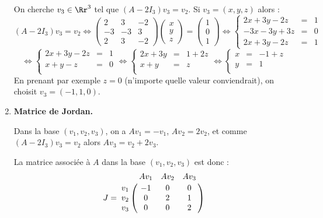 \documentclass[12pt, class=report,crop=false]{standalone}
\begin{document}
\begin{exemple}
\begin{enumerate}
  On cherche $v_3 \in \Rr^3$ tel que $(A-2I_3)v_3 = v_2$.
  Si $v_3 = (x,y,z)$ alors :
  $$(A-2I_3)v_3 = v_2 
  \iff 
  \begin{pmatrix}
  2 & 3 & -2 \\
  -3 & -3 & 3 \\
  2 & 3 & -2
  \end{pmatrix}
  \begin{pmatrix}
  x \\ y \\ z
  \end{pmatrix}
  = \begin{pmatrix}1\\0 \\1\end{pmatrix}
  \iff   
  \left\{\begin{array}{rcl}
  2x  + 3y -2z &=& 1\\
  -3x -3y + 3z &=& 0 \\
  2x  + 3y -2z &=& 1
  \end{array}\right.
  $$
  $$
  \iff
  \left\{\begin{array}{rcl}
  2x  + 3y -2z &=& 1\\
  x +y - z &=& 0 \\
  \end{array}\right.
 \iff
  \left\{\begin{array}{rcl}
  2x  + 3y &=& 1+2z\\
  x + y  &=& z \\
  \end{array}\right. 
  \iff
 \left\{\begin{array}{rcl}
  x &=& -1+z\\
  y &=& 1 \\
  \end{array}\right.   
  $$
  En prenant par exemple $z=0$ (n'importe quelle valeur conviendrait), on choisit
  $v_3 = (-1,1,0)$.
  
  
  \item \textbf{Matrice de Jordan.}
  
  Dans la base $(v_1,v_2,v_3)$, on a 
  $Av_1 = -v_1$, $A v_ 2 = 2v_2$, et
  comme $(A-2I_3) v_3 = v_2$ alors $A v_3 = v_2 + 2v_3$.
  
  La matrice associée à $A$ dans la base  $(v_1,v_2,v_3)$ est
  donc :
  $$J = %
  \bordermatrix{
  & Av_1 & Av_2 & Av_3 \cr
  v_1&-1 & 0 & 0 \cr
  v_2&0 & 2 & 1 \cr
  v_3&0 & 0 & 2}
  $$


\end{enumerate}
\end{exemple}
\end{document}
